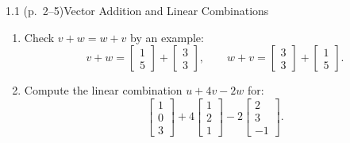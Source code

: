 \documentclass[11pt,a4paper,openany,oneside]{book}
\def\vect#1{#1}%
\def\mathbf#1{#1}%
\newcommand{\vect}[1]{\mathbf{#1}}
\numberwithin{equation}{chapter}
\begin{document}
\begin{example}{1.1 (p.\ 2--5)}{Vector Addition and Linear Combinations}
\begin{enumerate}
\item Check $\vect{v}+\vect{w} = \vect{w}+\vect{v}$ by an example:
\[
\vect{v}+\vect{w} = \begin{bmatrix} 1 \\ 5 \end{bmatrix} + \begin{bmatrix} 3 \\ 3 \end{bmatrix}, \qquad \vect{w}+\vect{v} = \begin{bmatrix} 3 \\ 3 \end{bmatrix} + \begin{bmatrix} 1 \\ 5 \end{bmatrix}.
\]
\item Compute the linear combination $\vect{u} + 4\vect{v} - 2\vect{w}$ for:
\[
\begin{bmatrix} 1 \\ 0 \\ 3 \end{bmatrix} + 4\begin{bmatrix} 1 \\ 2 \\ 1 \end{bmatrix} - 2\begin{bmatrix} 2 \\ 3 \\ -1 \end{bmatrix}.
\]
\end{enumerate}
\end{example}
\end{document}
